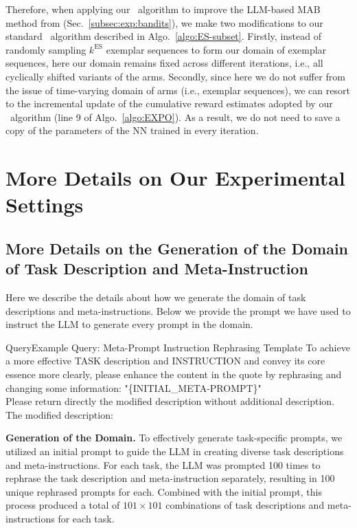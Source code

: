 Therefore, when applying our \alges~algorithm to improve the LLM-based MAB method from \citet{krishnamurthy2024can} (Sec.~\ref{subsec:exp:bandits}), we make two modifications to our standard \alges~algorithm described in Algo.~\ref{algo:ES-subset}.
Firstly, instead of randomly sampling $k^{\text{ES}}$ exemplar sequences to form our domain of exemplar sequences, here our domain remains fixed across different iterations, i.e., all cyclically shifted variants of the arms.
Secondly, since here we do not suffer from the issue of time-varying domain of arms (i.e., exemplar sequences), we can resort to the incremental update of the cumulative reward estimates adopted by our \alg~algorithm (line 9 of Algo.~\ref{algo:EXPO}). As a result, we do not need to save a copy of the parameters of the NN trained in every iteration.





\section{More Details on Our Experimental Settings}

\subsection{More Details on the Generation of the Domain of Task Description and Meta-Instruction}
\label{app:subsec:detail:domain:generation}
Here we describe the details about how we generate the domain of task descriptions and meta-instructions.
Below we provide the prompt we have used to instruct the LLM to generate every prompt in the domain.


\begin{mycolorbox}{Query}{Example Query: Meta-Prompt Instruction Rephrasing Template}
\small
To achieve a more effective TASK description and INSTRUCTION and convey its core essence more clearly, please enhance the content in the quote by rephrasing and changing some information: "\{INITIAL\_META-PROMPT\}" \\ 
Please return directly the modified description without additional description. \\
The modified description: \\
\end{mycolorbox}

\textbf{Generation of the Domain.}
To effectively generate task-specific prompts, we utilized an initial prompt to guide the LLM in creating diverse task descriptions and meta-instructions. For each task, the LLM was prompted 100 times to rephrase the task description and meta-instruction separately, resulting in 100 unique rephrased prompts for each. Combined with the initial prompt, this process produced a total of \(101 \times 101\) combinations of task descriptions and meta-instructions for each task. 

